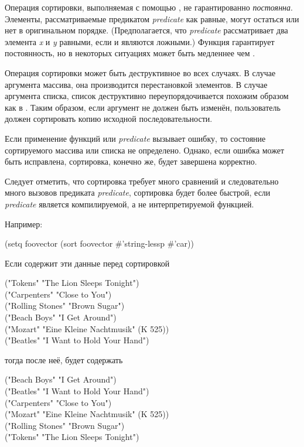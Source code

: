 \begin{defun}[Функция]
Операция сортировки, выполняемая с помощью , не гарантированно
\emph{постоянна}.
Элементы, рассматриваемые предикатом \emph{predicate} как равные, могут остаться
или нет в оригинальном порядке.
(Предполагается, что \emph{predicate} рассматривает два элемента \emph{x} и
\emph{y} равными, если 
 и
 являются ложными.)
Функция  гарантирует постоянность, но в некоторых ситуациях
может быть медленнее чем .

Операция сортировки может быть деструктивное во всех случаях. В случае аргумента
массива, она производится перестановкой элементов.
В случае аргумента списка, список деструктивно переупорядочивается похожим
образом как в .
Таким образом, если аргумент не должен быть изменён, пользователь должен
сортировать копию исходной последовательности.

Если применение функций  или \emph{predicate} вызывает ошибку, то
состояние сортируемого массива или списка не определено.
Однако, если ошибка может быть исправлена, сортировка, конечно же, будет
завершена корректно.

Следует отметить, что сортировка требует много сравнений и следовательно много
вызовов предиката \emph{predicate}, сортировка будет более быстрой, если
\emph{predicate} является компилируемой, а не интерпретируемой функцией.

Например:
\begin{lisp}
(setq foovector (sort foovector \#'string-lessp  \#'car))
\end{lisp}
Если  содержит эти данные перед сортировкой
\begin{lisp}
("Tokens" "The Lion Sleeps Tonight") \\
("Carpenters" "Close to You") \\
("Rolling Stones" "Brown Sugar") \\
("Beach Boys" "I Get Around") \\
("Mozart" "Eine Kleine Nachtmusik" (K 525)) \\
("Beatles" "I Want to Hold Your Hand")
\end{lisp}
тогда после неё,  будет содержать
\begin{lisp}
("Beach Boys" "I Get Around") \\
("Beatles" "I Want to Hold Your Hand") \\
("Carpenters" "Close to You") \\
("Mozart" "Eine Kleine Nachtmusik" (K 525)) \\
("Rolling Stones" "Brown Sugar") \\
("Tokens" "The Lion Sleeps Tonight")
\end{lisp}


\end{defun}

